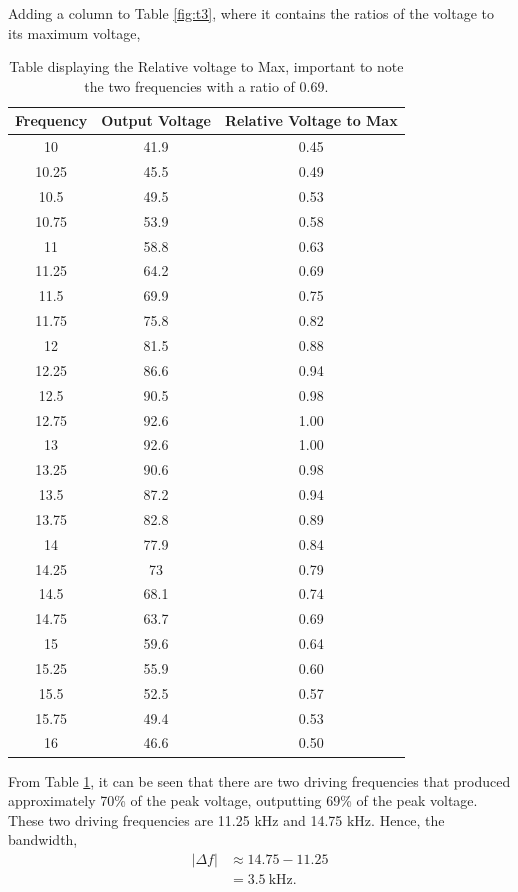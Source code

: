 \documentclass{article}
\begin{document}
Adding a column to Table \ref{fig:t3}, where it contains the ratios of the 
voltage to its maximum voltage,

\begin{table}[H]
    \centering
    \begin{tabular}{c|c|c}
        Frequency & Output Voltage & Relative Voltage to Max \\
        \hline
        10	&	41.9	&	0.45	\\
        10.25	&	45.5	&	0.49	\\
        10.5	&	49.5	&	0.53	\\
        10.75	&	53.9	&	0.58	\\
        11	&	58.8	&	0.63	\\
        11.25	&	64.2	&	0.69	\\
        11.5	&	69.9	&	0.75	\\
        11.75	&	75.8	&	0.82	\\
        12	&	81.5	&	0.88	\\
        12.25	&	86.6	&	0.94	\\
        12.5	&	90.5	&	0.98	\\
        12.75	&	92.6	&	1.00	\\
        13	&	92.6	&	1.00	\\
        13.25	&	90.6	&	0.98	\\
        13.5	&	87.2	&	0.94	\\
        13.75	&	82.8	&	0.89	\\
        14	&	77.9	&	0.84	\\
        14.25	&	73	&	0.79	\\
        14.5	&	68.1	&	0.74	\\
        14.75	&	63.7	&	0.69	\\
        15	&	59.6	&	0.64	\\
        15.25	&	55.9	&	0.60	\\
        15.5	&	52.5	&	0.57	\\
        15.75	&	49.4	&	0.53	\\
        16	&	46.6	&	0.50	
    \end{tabular}
    \caption{Table displaying the Relative voltage to Max, important to 
    note the two frequencies with a ratio of 0.69.}
    \label{fig:t0}
\end{table}

From Table \ref{fig:t0}, it can be seen that there are two driving frequencies 
that produced approximately 70\% of the peak voltage, outputting 69\% of the 
peak voltage. These two driving frequencies are 11.25 kHz and 14.75 kHz. Hence,
the bandwidth,
\begin{equation}
    \begin{split}
    |\Delta f| &\approx 14.75 - 11.25 \\
    &= 3.5 \: \text{kHz}.   
    \end{split}
\end{equation}
\end{document}
